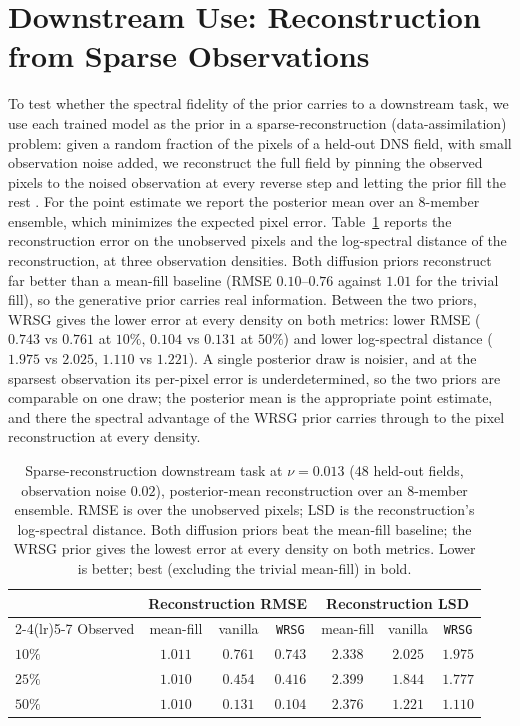 \documentclass[10pt]{article} %
\begin{document}
\section{Downstream Use: Reconstruction from Sparse Observations}
\label{app:downstream}

To test whether the spectral fidelity of the prior carries to a downstream task, we use each trained model as the prior in a sparse-reconstruction (data-assimilation) problem: given a random fraction of the pixels of a held-out DNS field, with small observation noise added, we reconstruct the full field by pinning the observed pixels to the noised observation at every reverse step and letting the prior fill the rest \citep{lugmayr2022repaint}. For the point estimate we report the posterior mean over an $8$-member ensemble, which minimizes the expected pixel error. Table~\ref{tab:downstream} reports the reconstruction error on the unobserved pixels and the log-spectral distance of the reconstruction, at three observation densities. Both diffusion priors reconstruct far better than a mean-fill baseline (RMSE $0.10$--$0.76$ against $1.01$ for the trivial fill), so the generative prior carries real information. Between the two priors, WRSG gives the lower error at every density on both metrics: lower RMSE ($0.743$ vs $0.761$ at $10\%$, $0.104$ vs $0.131$ at $50\%$) and lower log-spectral distance ($1.975$ vs $2.025$, $1.110$ vs $1.221$). A single posterior draw is noisier, and at the sparsest observation its per-pixel error is underdetermined, so the two priors are comparable on one draw; the posterior mean is the appropriate point estimate, and there the spectral advantage of the WRSG prior carries through to the pixel reconstruction at every density.

\begin{table}[H]
\centering
\caption{Sparse-reconstruction downstream task at $\nu=0.013$ ($48$ held-out fields, observation noise $0.02$), posterior-mean reconstruction over an $8$-member ensemble. RMSE is over the unobserved pixels; LSD is the reconstruction's log-spectral distance. Both diffusion priors beat the mean-fill baseline; the WRSG prior gives the lowest error at every density on both metrics. Lower is better; best (excluding the trivial mean-fill) in bold.}
\label{tab:downstream}
\setlength{\tabcolsep}{5pt}
\begin{tabular}{lcccccc}
\toprule
& \multicolumn{3}{c}{Reconstruction RMSE} & \multicolumn{3}{c}{Reconstruction LSD} \\
\cmidrule(lr){2-4}\cmidrule(lr){5-7}
Observed & mean-fill & vanilla & \texttt{WRSG} & mean-fill & vanilla & \texttt{WRSG} \\
\midrule
$10\%$ & $1.011$ & $0.761$ & $\mathbf{0.743}$ & $2.338$ & $2.025$ & $\mathbf{1.975}$ \\
$25\%$ & $1.010$ & $0.454$ & $\mathbf{0.416}$ & $2.399$ & $1.844$ & $\mathbf{1.777}$ \\
$50\%$ & $1.010$ & $0.131$ & $\mathbf{0.104}$ & $2.376$ & $1.221$ & $\mathbf{1.110}$ \\
\bottomrule
\end{tabular}
\end{table}
\end{document}
